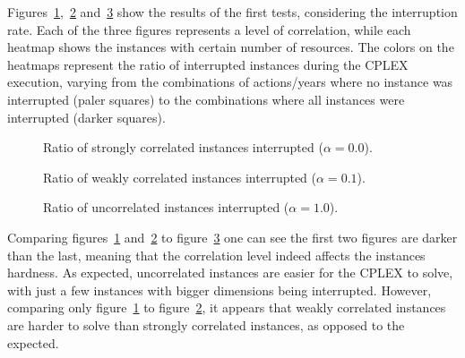 Figures~\ref{fig:result00},~\ref{fig:result01} and~\ref{fig:result10} show the results of the first tests, 
considering the interruption rate. Each of the three figures represents a level of correlation, while each heatmap 
shows the instances with certain number of resources. The colors on the heatmaps represent the ratio of interrupted 
instances during the CPLEX execution, varying from the combinations of actions/years where no instance was interrupted 
(paler squares) to the combinations where all instances were interrupted (darker squares).

\figpar
\begin{figure}[H]
  \centering
  \resizebox{\columnwidth}{!}{%
    \subfloat[1 resource]{}
    \subfloat[2 resources]{}
    \subfloat[4 resources]{}
  }
  \caption{Ratio of strongly correlated instances interrupted ($\alpha = 0.0$).}
  \label{fig:result00}
\end{figure}

\figspaces
\begin{figure}[H]
  \centering
  \resizebox{\columnwidth}{!}{%
    \subfloat[1 resource]{}
    \subfloat[2 resources]{}
    \subfloat[4 resources]{}
  }
  \caption{Ratio of weakly correlated instances interrupted ($\alpha = 0.1$).}
  \label{fig:result01}
\end{figure}

\figspaces
\begin{figure}[H]
  \centering
  \resizebox{\columnwidth}{!}{%
    \subfloat[1 resource]{}
    \subfloat[2 resources]{}
    \subfloat[4 resources]{}
  }
  \caption{Ratio of uncorrelated instances interrupted ($\alpha = 1.0$).}
  \label{fig:result10}
\end{figure}

Comparing figures~\ref{fig:result00} and~\ref{fig:result01} to figure~\ref{fig:result10} one can see the first two figures are darker 
than the last, meaning that the correlation level indeed affects the instances hardness. As expected, uncorrelated instances
are easier for the CPLEX to solve, with just a few instances with bigger dimensions being interrupted. However, comparing only 
figure~\ref{fig:result00} to figure~\ref{fig:result01}, it appears that weakly correlated instances are harder to solve than
strongly correlated instances, as opposed to the expected.

